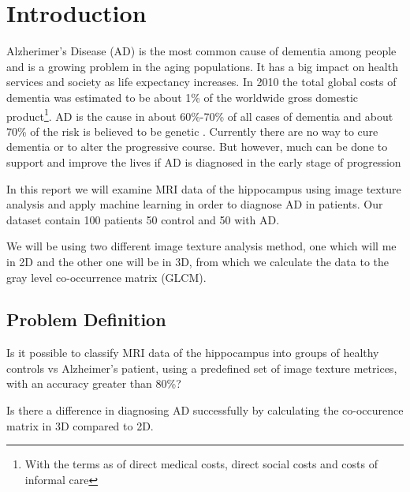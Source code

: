 \chapter{Introduction}

Alzherimer's Disease (AD) is the most common cause of dementia among people and is a growing problem in the aging populations. It has a big impact on health services and society as life expectancy increases. In 2010 the total global costs of dementia was estimated to be about 1\% of the worldwide gross domestic product\footnote{With the terms as of direct medical costs, direct social costs and costs of informal care}. AD is the cause in about 60\%-70\% of all cases of dementia\cite{Who} and about 70\% of the risk is believed to be genetic \cite{AlzheimerLancet}. Currently there are no way to cure dementia or to alter the progressive course. But however, much can be done to support and improve the lives if AD is diagnosed in the early stage of progression \cite{Who}

In this report we will examine MRI data of the hippocampus using image texture analysis and apply machine learning in order to diagnose AD in patients. Our dataset contain 100 patients 50 control and 50 with AD.

We will be using two different image texture analysis method, one which will me in 2D\cite{MRfreeborough}\cite{Castellano} and the other one will be in 3D\cite{Voxel}, from which we calculate the data to the gray level co-occ\-urren\-ce matrix (GLCM).



\section{Problem Definition}

Is it possible to classify MRI data of the hippocampus into groups of healthy controls vs Alzheimer's patient, using a predefined set of image texture metrices, with an accuracy great\-er than 80\%?

Is there a difference in diagnosing AD successfully by calculating the co-occurence matrix in 3D compared to 2D.









